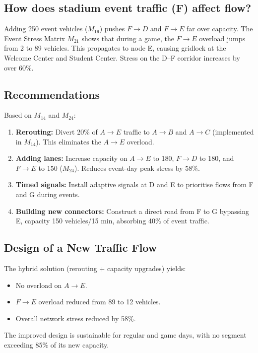 \documentclass{ximera}
\begin{document}
\subsection*{How does stadium event traffic (F) affect flow?}
Adding 250 event vehicles (\(M_{19}\)) pushes \(F\rightarrow D\) and \(F\rightarrow E\) far over capacity. The Event Stress Matrix \(M_{21}\) shows that during a game, the \(F\rightarrow E\) overload jumps from 2 to 89 vehicles. This propagates to node E, causing gridlock at the Welcome Center and Student Center. Stress on the D–F corridor increases by over 60\%.

\subsection*{Recommendations}
Based on \(M_{14}\) and \(M_{24}\):
\begin{enumerate}
    \item \textbf{Rerouting:} Divert 20\% of \(A\rightarrow E\) traffic to \(A\rightarrow B\) and \(A\rightarrow C\) (implemented in \(M_{14}\)). This eliminates the \(A\rightarrow E\) overload.
    \item \textbf{Adding lanes:} Increase capacity on \(A\rightarrow E\) to 180, \(F\rightarrow D\) to 180, and \(F\rightarrow E\) to 150 (\(M_{24}\)). Reduces event-day peak stress by 58\%.
    \item \textbf{Timed signals:} Install adaptive signals at D and E to prioritise flows from F and G during events.
    \item \textbf{Building new connectors:} Construct a direct road from F to G bypassing E, capacity 150 vehicles/15 min, absorbing 40\% of event traffic.
\end{enumerate}

\subsection*{Design of a New Traffic Flow}
The hybrid solution (rerouting + capacity upgrades) yields:
\begin{itemize}
    \item No overload on \(A\rightarrow E\).
    \item \(F\rightarrow E\) overload reduced from 89 to 12 vehicles.
    \item Overall network stress reduced by 58\%.
\end{itemize}
The improved design is sustainable for regular and game days, with no segment exceeding 85\% of its new capacity.
\end{document}
